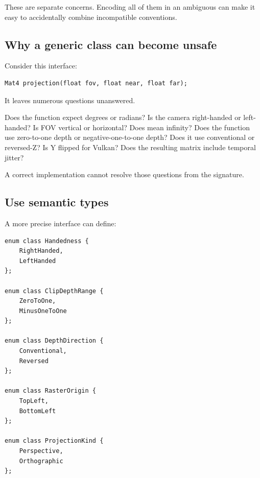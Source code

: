 These are separate concerns. Encoding all of them in an ambiguous  can make it easy to accidentally combine incompatible conventions.

\subsection{\texorpdfstring{Why a generic  class can become unsafe}{Why a generic Camera class can become unsafe}}\label{02-foundations-ii-ch037-why-a-generic-camera-class-can-become-unsafe}

\hypertarget{02-foundations-ii-ch037-why-a-generic-camera-class-can-become-unsafe}{}

Consider this interface:

\begin{verbatim}
Mat4 projection(float fov, float near, float far);
\end{verbatim}

It leaves numerous questions unanswered.

Does the function expect degrees or radians? Is the camera right-handed or left-handed? Is FOV vertical or horizontal? Does  mean infinity? Does the function use zero-to-one depth or negative-one-to-one depth? Does it use conventional or reversed-Z? Is Y flipped for Vulkan? Does the resulting matrix include temporal jitter?

A correct implementation cannot resolve those questions from the signature.

\subsection{Use semantic types}\label{02-foundations-ii-ch037-use-semantic-types}

\hypertarget{02-foundations-ii-ch037-use-semantic-types}{}

A more precise interface can define:

\begin{verbatim}
enum class Handedness {
    RightHanded,
    LeftHanded
};

enum class ClipDepthRange {
    ZeroToOne,
    MinusOneToOne
};

enum class DepthDirection {
    Conventional,
    Reversed
};

enum class RasterOrigin {
    TopLeft,
    BottomLeft
};

enum class ProjectionKind {
    Perspective,
    Orthographic
};
\end{verbatim}

